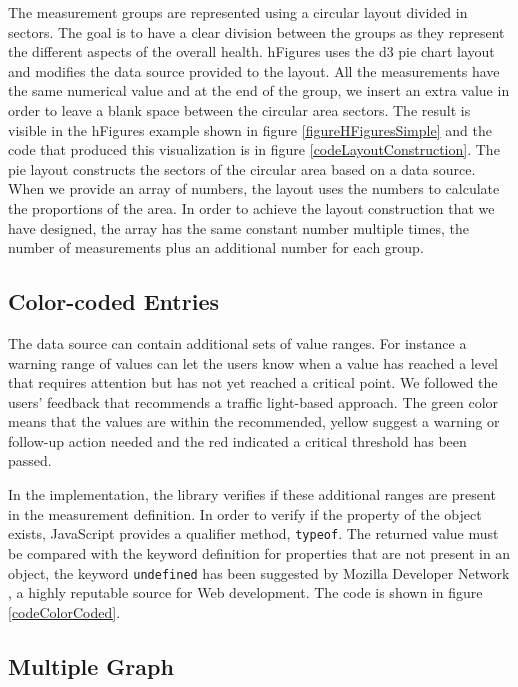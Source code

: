 \documentclass[twocolumn]{bmcart}%
\begin{document}
The measurement groups are represented using a circular layout divided in sectors. The goal is to have a clear division between the groups as they represent the different aspects of the overall health. hFigures uses the d3 pie chart layout and modifies the data source provided to the layout. All the measurements have the same numerical value and at the end of the group, we insert an extra value in order to leave a blank space between the circular area sectors. The result is visible in the hFigures example shown in figure \ref{figureHFiguresSimple} and the code that produced this visualization is in figure \ref{codeLayoutConstruction}. The pie layout constructs the sectors of the circular area based on a data source. When we provide an array of numbers, the layout uses the numbers to calculate the proportions of the area. In order to achieve the layout construction that we have designed, the array has the same constant number multiple times, the number of measurements plus an additional number for each group. 

\subsection*{Color-coded Entries}

The data source can contain additional sets of value ranges. For instance a warning range of values can let the users know when a value has reached a level that requires attention but has not yet reached a critical point. We followed the users' feedback that recommends a traffic light-based approach. The green color means that the values are within the recommended, yellow suggest a warning or follow-up action needed and the red indicated a critical threshold has been passed.

In the implementation, the library verifies if these additional ranges are present in the measurement definition. In order to verify if the property of the object exists, JavaScript provides a qualifier method, \texttt{typeof}. The returned value must be compared with the keyword definition for properties that are not present in an object, the keyword \texttt{undefined} has been suggested by Mozilla Developer Network \cite{MDNJS}, a highly reputable source for Web development. The code is shown in figure \ref{codeColorCoded}.

\subsection*{Multiple Graph}
\end{document}
